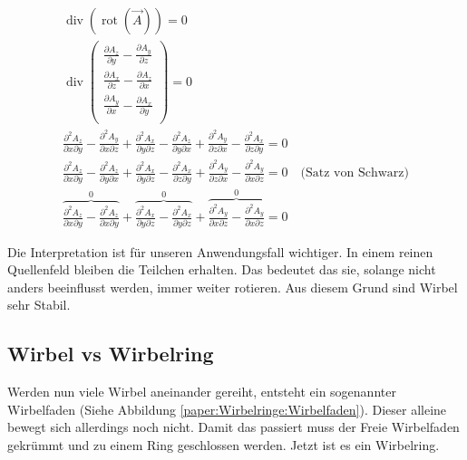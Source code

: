 \begin{gather*}
\operatorname{div} \left( \operatorname{rot} \left( \vec{A} \right) \right) 
= 0\\
\operatorname{div}      
    \begin{pmatrix} 
        \frac{\partial A_z}{\partial y} - \frac{\partial A_y}{\partial z} \\ 
        \frac{\partial A_x}{\partial z} - \frac{\partial A_z}{\partial x} \\ 
        \frac{\partial A_y}{\partial x} - \frac{\partial A_x}{\partial y} \\ 
    \end{pmatrix} 
= 0\\
\frac{\partial^2 A_z}{\partial x \partial y} - \frac{\partial^2 A_y}{\partial x \partial z} + 
\frac{\partial^2 A_x}{\partial y \partial z} - \frac{\partial^2 A_z}{\partial y \partial x} +
\frac{\partial^2 A_y}{\partial z \partial x} - \frac{\partial^2 A_x}{\partial z \partial y}
= 0\\
\frac{\partial^2 A_z}{\partial x \partial y} - \frac{\partial^2 A_z}{\partial y \partial x} + 
\frac{\partial^2 A_x}{\partial y \partial z} - \frac{\partial^2 A_x}{\partial z \partial y} +
\frac{\partial^2 A_y}{\partial z \partial x} - \frac{\partial^2 A_y}{\partial x \partial z}
= 0 \quad \text{(Satz von Schwarz)}\\
\overbrace{\frac{\partial^2 A_z}{\partial x \partial y} - \frac{\partial^2 A_z}{\partial x \partial y}}^0 + 
\overbrace{\frac{\partial^2 A_x}{\partial y \partial z} - \frac{\partial^2 A_x}{\partial y \partial z}}^0 +
\overbrace{\frac{\partial^2 A_y}{\partial x \partial z} - \frac{\partial^2 A_y}{\partial x \partial z}}^0
= 0 
\end{gather*}

Die Interpretation ist für unseren Anwendungsfall wichtiger. 
In einem reinen Quellenfeld bleiben die Teilchen erhalten. 
Das bedeutet das sie, solange nicht anders beeinflusst werden, immer weiter rotieren. 
Aus diesem Grund sind Wirbel sehr Stabil.


\subsection{Wirbel vs Wirbelring}

Werden nun viele Wirbel aneinander gereiht, entsteht ein sogenannter Wirbelfaden (Siehe Abbildung \ref{paper:Wirbelringe:Wirbelfaden}).
Dieser alleine bewegt sich allerdings noch nicht. 
Damit das passiert muss der Freie Wirbelfaden gekrümmt und zu einem Ring geschlossen werden. 
Jetzt ist es ein Wirbelring.
